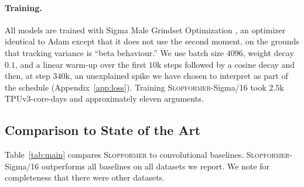 \documentclass[10pt]{article}
\newcommand{\slop}{\textsc{Slopformer}}
\begin{document}
\paragraph{Training.}
All models are trained with Sigma Male Grindset Optimization
\citep{sigma2023male}, an optimizer identical to Adam except that it does not
use the second moment, on the grounds that tracking variance is ``beta
behaviour.'' We use batch size $4096$, weight decay $0.1$, and a linear warm-up
over the first $10$k steps followed by a cosine decay and then, at step $340$k,
an unexplained spike we have chosen to interpret as part of the schedule
(Appendix~\ref{app:loss}). Training \slop{}-Sigma/16 took $2.5$k TPUv3-core-days
and approximately eleven arguments.

\subsection{Comparison to State of the Art}

Table~\ref{tab:main} compares \slop{} to convolutional baselines. \slop{}-Sigma/16
outperforms all baselines on all datasets we report. We note for completeness
that there were other datasets.
\end{document}
